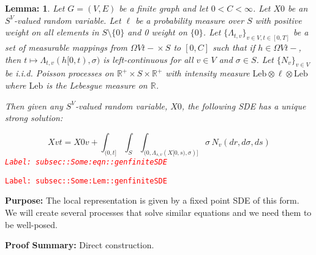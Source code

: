 \documentclass[12pt]{article}
\newcommand{\mb}{\mathbb}
\newcommand{\te}{\text}
\newcommand{\tr}{\textcolor{red}}
\newcommand{\labe}[1]{\tr{\texttt{Label: #1}}}
\newcommand{\purpose}{\textbf{Purpose: }}
\newcommand{\pfsum}{\textbf{Proof Summary: }}
\newcommand{\ind}{\hspace{24pt}}
\renewcommand{\v}{v}							%
\renewcommand{\S}{S}							%
\newcommand{\s}{\sigma}							%
\newcommand{\T}{T}								%
\renewcommand{\t}{t}							%
\renewcommand{\tt}{s}							%
\newcommand{\X}{X}								%
\newcommand{\const}{C}							%
\newcommand{\poiss}[1]{N_{#1}}						%
\newcommand{\leb}{\te{Leb}}							%
\renewcommand{\r}{r}								%
\newcommand{\ratee}[1]{\Lambda_{#1}}				%
\newcommand{\Sm}{\ell}								%
\newtheorem{lem}[thms]{Lemma: }
\begin{document}
\begin{lem}
Let \(G = ( V,E)\) be a finite graph and let \(0 < \const{}< \infty\). Let \(\X{}{0}\) be an \(\S^ V\)-valued random variable. Let \(\Sm\) be a probability measure over \(\S\) with positive weight on all elements in \(S\setminus\{0\}\) and 0 weight on \(\{0\}\). Let \(\{\ratee{\t,\v}\}_{\v \in  V,\t\in [0,\T]}\) be a set of measurable mappings from \(\Omega{ V}{\t-} \times \S\) to \([0,\const{}]\) such that if \(h \in \Omega{ V}{\t-}\), then \(\t\mapsto \ratee{\t,\v}(h[0,\t),\s)\) is left-continuous for all \(\v \in  V\) and \(\s \in \S\). Let \(\{\poiss{\v}\}_{\v \in  V}\) be i.i.d. Poisson processes on \(\mb{R}^+\times \S\times\mb{R}^+\) with intensity measure \(\leb\otimes\Sm\otimes\leb\) where \(\leb\) is the Lebesgue measure on \(\mb{R}\).

\ind Then given any \(\S^ V\)-valued random variable, \(\X{}{0}\), the following SDE has a unique strong solution:

\begin{equation}
\X{\v}{\t} = \X{0}{\v} + \int_{(0,\t]}\int_\S\int_{(0,\ratee{\tt,\v}(\X{}{[0,\tt)},\s)]}  \s\,\poiss{\v}(d\r,d\s,d\tt)
\label{subsec::Some:eqn::genfiniteSDE}
\end{equation}
\labe{subsec::Some:eqn::genfiniteSDE}
\label{subsec::Some:Lem::genfiniteSDE}
\end{lem}
\labe{subsec::Some:Lem::genfiniteSDE}

\purpose The local representation is given by a fixed point SDE of this form. We will create several processes that solve similar equations and we need them to be well-posed.

\pfsum Direct construction.
\end{document}

